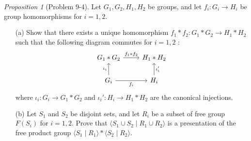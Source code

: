 \documentclass[a4paper]{article}
\theoremstyle{remark}
\newtheorem{prop}{Proposition}
\begin{document}
\begin{prop}[Problem 9-4]
	Let $G_1,G_2,H_1,H_2$ be groups, and let $f_i:  G_i \to H_i$ be group homomorphisms for $i = 1,2$.
	\begin{enumerate}
		\item [(a)] Show that there exists a unique homomorphism $f_1 * f_2 : G_1 * G_2 \to H_1 * H_2$ such that the following diagram commutes for $i = 1,2$ :
		\[
		\begin{tikzcd}
		G_1 * G_2 \arrow[r,"f_1*f_2"] & H_1 * H_2 \\
		G_i \arrow[u,"\iota_i"] \arrow[r,"f_i",swap] & H_i \arrow[u,"\iota_i'",swap]
		\end{tikzcd}
		\]
		where $\iota_i : G_i \to G_1 * G_2$ and $\iota_i' : H_i \to H_1 * H_2$ are the canonical injections.
		
		\item [(b)] Let $S_1$ and $S_2$ be disjoint sets, and let $R_i$ be a subset of free group $F(S_i)$ for $i=1,2$. Prove that $\langle S_1 \cup S_2 \mid R_1 \cup R_2 \rangle$ is a presentation of the free product group $\langle S_1 \mid R_1 \rangle * \langle S_2 \mid R_2 \rangle$. 
	\end{enumerate}
\end{prop}
\end{document}
